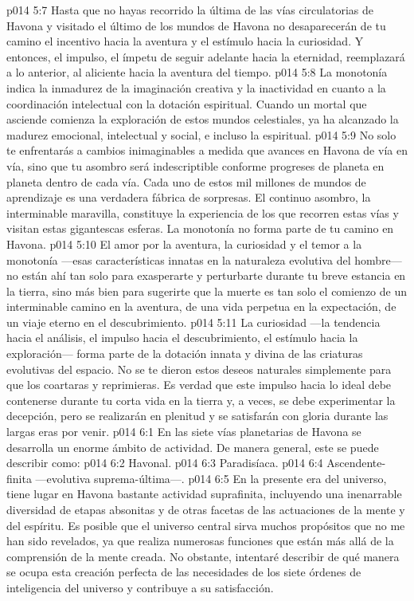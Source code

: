 \vs p014 5:7 Hasta que no hayas recorrido la última de las vías circulatorias de Havona y visitado el último de los mundos de Havona no desaparecerán de tu camino el incentivo hacia la aventura y el estímulo hacia la curiosidad. Y entonces, el impulso, el ímpetu de seguir adelante hacia la eternidad, reemplazará a lo anterior, al aliciente hacia la aventura del tiempo.
\vs p014 5:8 La monotonía indica la inmadurez de la imaginación creativa y la inactividad en cuanto a la coordinación intelectual con la dotación espiritual. Cuando un mortal que asciende comienza la exploración de estos mundos celestiales, ya ha alcanzado la madurez emocional, intelectual y social, e incluso la espiritual.
\vs p014 5:9 No solo te enfrentarás a cambios inimaginables a medida que avances en Havona de vía en vía, sino que tu asombro será indescriptible conforme progreses de planeta en planeta dentro de cada vía. Cada uno de estos mil millones de mundos de aprendizaje es una verdadera fábrica de sorpresas. El continuo asombro, la interminable maravilla, constituye la experiencia de los que recorren estas vías y visitan estas gigantescas esferas. La monotonía no forma parte de tu camino en Havona.
\vs p014 5:10 El amor por la aventura, la curiosidad y el temor a la monotonía ---esas características innatas en la naturaleza evolutiva del hombre--- no están ahí tan solo para exasperarte y perturbarte durante tu breve estancia en la tierra, sino más bien para sugerirte que la muerte es tan solo el comienzo de un interminable camino en la aventura, de una vida perpetua en la expectación, de un viaje eterno en el descubrimiento.
\vs p014 5:11 La curiosidad ---la tendencia hacia el análisis, el impulso hacia el descubrimiento, el estímulo hacia la exploración--- forma parte de la dotación innata y divina de las criaturas evolutivas del espacio. No se te dieron estos deseos naturales simplemente para que los coartaras y reprimieras. Es verdad que este impulso hacia lo ideal debe contenerse durante tu corta vida en la tierra y, a veces, se debe experimentar la decepción, pero se realizarán en plenitud y se satisfarán con gloria durante las largas eras por venir.
\vs p014 6:1 En las siete vías planetarias de Havona se desarrolla un enorme ámbito de actividad. De manera general, este se puede describir como:
\vs p014 6:2 Havonal.
\vs p014 6:3 Paradisíaca.
\vs p014 6:4 Ascendente\hyp{}finita ---evolutiva suprema\hyp{}última---.
\vs p014 6:5 \pc En la presente era del universo, tiene lugar en Havona bastante actividad suprafinita, incluyendo una inenarrable diversidad de etapas absonitas y de otras facetas de las actuaciones de la mente y del espíritu. Es posible que el universo central sirva muchos propósitos que no me han sido revelados, ya que realiza numerosas funciones que están más allá de la comprensión de la mente creada. No obstante, intentaré describir de qué manera se ocupa esta creación perfecta de las necesidades de los siete órdenes de inteligencia del universo y contribuye a su satisfacción.

